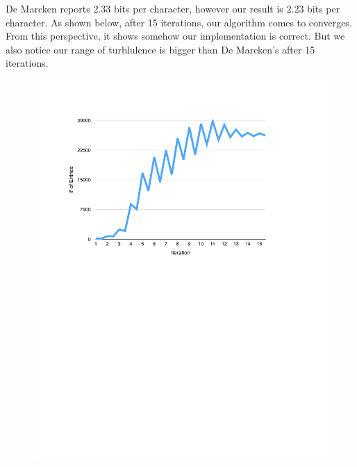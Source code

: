 \documentclass[11pt, oneside, fleqn]{article}
\begin{document}
  De Marcken reports 2.33 bits per character, however our result is 2.23 bits per character. As shown below, after 15 iterations, our algorithm comes to converges. From this perspective, it shows somehow our implementation is correct. But we also notice our range of turblulence is bigger than De Marcken's after 15 iterations.

  \begin{figure}[h]
  \includegraphics{./figure/entropy_per_iteration.pdf}
  \end{figure}
\end{document}

